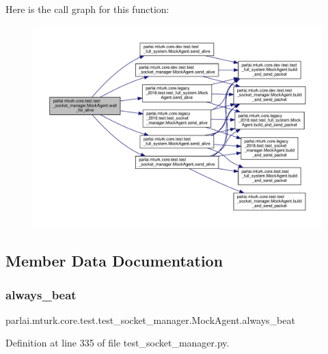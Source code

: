 Here is the call graph for this function\+:
\nopagebreak
\begin{figure}[H]
\begin{center}
\leavevmode
\includegraphics[width=350pt]{classparlai_1_1mturk_1_1core_1_1test_1_1test__socket__manager_1_1MockAgent_afb67694efb9a09d70b0d73eceae3a702_cgraph}
\end{center}
\end{figure}


\subsection{Member Data Documentation}
\mbox{\label{classparlai_1_1mturk_1_1core_1_1test_1_1test__socket__manager_1_1MockAgent_a94aacc6f377f546c2d6b049e9badc1fc}} 
\subsubsection{\texorpdfstring{always\+\_\+beat}{always\_beat}}
{\footnotesize\ttfamily parlai.\+mturk.\+core.\+test.\+test\+\_\+socket\+\_\+manager.\+Mock\+Agent.\+always\+\_\+beat}



Definition at line 335 of file test\+\_\+socket\+\_\+manager.\+py.



